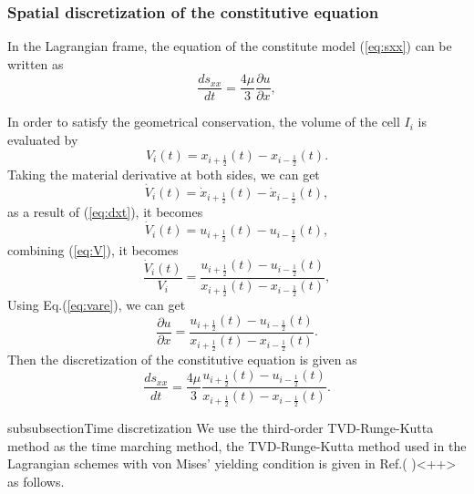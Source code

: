 \documentclass{article}
\numberwithin{equation}{section}
\numberwithin{table}{section}
\begin{document}
\subsubsection{Spatial discretization of the constitutive equation}
In the Lagrangian frame, the equation of the constitute model (\ref{eq:sxx}) can be written as
\begin{equation}
  \frac{ds_{xx}}{dt} = \frac{4\mu }{3} \frac{\partial u}{\partial x},
\end{equation}

In order to satisfy the geometrical conservation, the volume of the cell $I_i$ is evaluated by
\begin{equation}\label{eq:V}
  V_i(t) = x_{i+\frac{1}{2}}(t) - x_{i-\frac{1}{2}}(t).
\end{equation}
Taking the material derivative at both sides, we can get
\begin{equation}\label{eq:dotV}
  \dot{V}_i(t) = \dot{x}_{i+\frac{1}{2}}(t) - \dot{x}_{i-\frac{1}{2}}(t),
\end{equation}
as a result of (\ref{eq:dxt}), it becomes
\begin{equation}\label{eq:dotV}
  \dot{V}_i(t) = u_{i+\frac{1}{2}}(t) - u_{i-\frac{1}{2}}(t),
\end{equation}
combining (\ref{eq:V}), it becomes
\begin{equation}
  \frac{\dot{V}_i(t)}{V_i} =\frac{ u_{i+\frac{1}{2}}(t) - u_{i-\frac{1}{2}}(t)}{ x_{i+\frac{1}{2}}(t) - x_{i-\frac{1}{2}}(t)},
\end{equation}
Using Eq.(\ref{eq:vare}), we can get
\begin{equation}
  \frac{\partial u}{\partial x} =\frac{ u_{i+\frac{1}{2}}(t) - u_{i-\frac{1}{2}}(t)}{ x_{i+\frac{1}{2}}(t) - x_{i-\frac{1}{2}}(t)}.
\end{equation}
Then  the  discretization of the constitutive equation is given as
\begin{equation}\label{eq:semSxx}
  \frac{d s_{xx}}{dt } =\frac{4\mu}{3} \frac{ u_{i+\frac{1}{2}}(t) - u_{i-\frac{1}{2}}(t)}{ x_{i+\frac{1}{2}}(t) - x_{i-\frac{1}{2}}(t)}.
\end{equation}

subsubsection{Time discretization}
We use the third-order TVD-Runge-Kutta method  as the time marching method, the TVD-Runge-Kutta method used in the Lagrangian schemes with von Mises' yielding condition is given in Ref.( )<++> as follows.
\end{document}
